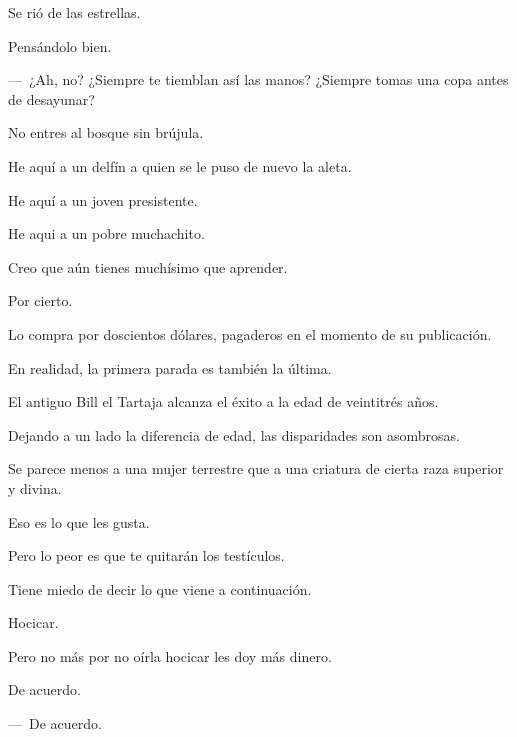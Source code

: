 \sk
Se rió de las estrellas. 

\sk
Pensándolo bien. 

\sk
---~¿Ah, no? ¿Siempre te tiemblan así las manos? ¿Siempre tomas una copa antes de desayunar?\nb{}

\sk
No entres al bosque sin brújula. 

\sk
He aquí a un delfín a quien se le puso de nuevo la aleta. 

\sk
He aquí a un joven presistente. 

\sk
He aqui a un pobre muchachito. 

\sk
Creo que aún tienes muchísimo que aprender. 

\sk
Por cierto. 

\sk
Lo compra por doscientos dólares, pagaderos en el momento de su publica\-ción. 

\sk
En realidad, la primera parada es también la última.\nb{}

\sk
El antiguo Bill el Tartaja alcanza el éxito a la edad de veintitrés años. 

\sk
 Dejando a un lado la diferencia de edad, las disparidades son asombrosas. \nb{}

\sk
Se parece menos a una mujer terrestre que a una criatura de cierta raza superior y divina. \nb{}

\sk
Eso es lo que les gusta. 

\sk
 Pero lo peor es que te quitarán los testículos. \nb{}

\sk
Tiene miedo de decir lo que viene a continuación. 

\sk
Hocicar. 

\sk
Pero no más por no oírla hocicar les doy más dinero. 

\sk
De acuerdo. 

\sk
---~De acuerdo.

